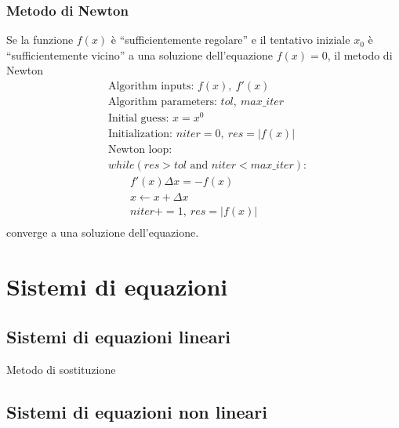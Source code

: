 \subsubsection{Metodo di Newton}
Se la funzione $f(x)$ è ``sufficientemente regolare'' e il tentativo iniziale $x_0$ è ``sufficientemente vicino'' a una soluzione dell'equazione $f(x) = 0$, il metodo di Newton
\begin{equation}
\begin{aligned}
& \text{Algorithm inputs: } f(x), \ f'(x) \\
& \text{Algorithm parameters: } tol, \ max\_iter \\
& \text{Initial guess: } x = x^0 \\
& \text{Initialization: } niter = 0, \ res = |f(x)| \\
& \text{Newton loop: } \\
& while ( res > tol \text{ and } niter < max\_iter ): \\ 
& \qquad f'(x) \Delta x = - f(x) \\
& \qquad x \leftarrow x + \Delta x \\
& \qquad niter += 1, \ res = |f(x)| \\
\end{aligned}
\end{equation}
converge a una soluzione dell'equazione.

\section{Sistemi di equazioni}
\subsection{Sistemi di equazioni lineari}
{\color{red} Metodo di sostituzione}

\subsection{Sistemi di equazioni non lineari}
